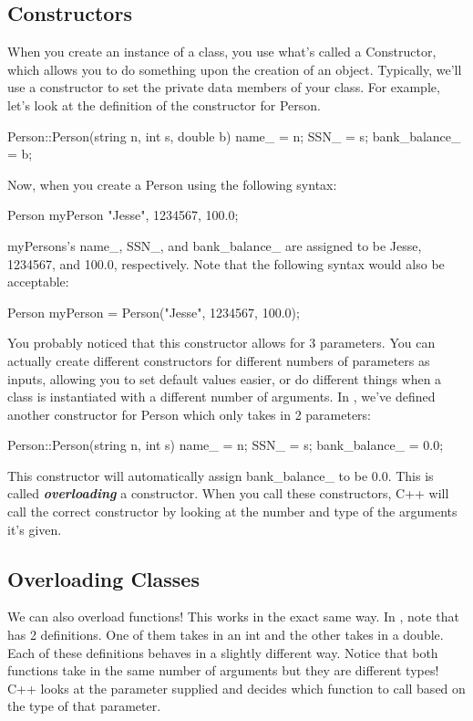 \documentclass{tufte-handout}
\begin{document}
\subsection{Constructors}
When you create an instance of a class, you use what's called a Constructor, which allows you to do something upon the creation of an object.
Typically, we'll use a constructor to set the private data members of your class.
For example, let's look at the definition of the constructor for Person.
\begin{Code}
Person::Person(string n, int s, double b) 
{
    name_ = n;
    SSN_ = s;
    bank_balance_ = b;
}
\end{Code}
Now, when you create a Person using the following syntax:
\begin{Code}
    Person myPerson {"Jesse", 1234567, 100.0};
\end{Code}

myPersons's name\_, SSN\_, and bank\_balance\_ are assigned to be Jesse, 1234567, and 100.0, respectively. 
Note that the following syntax would also be acceptable:
\begin{Code}
    Person myPerson = Person("Jesse", 1234567, 100.0);
\end{Code}

You probably noticed that this constructor allows for 3 parameters.
You can actually create different constructors for different numbers of parameters as inputs, allowing you to set default values easier, or do different things when a class is instantiated with a different number of arguments.
In , we've defined another constructor for Person which only takes in 2 parameters:
\begin{Code}
Person::Person(string n, int s) 
{
    name_ = n;
    SSN_ = s;
    bank_balance_ = 0.0;
}
\end{Code}
This constructor will automatically assign bank\_balance\_ to be 0.0.
This is called \textit{\textbf{overloading}} a constructor.
When you call these constructors, C++ will call the correct constructor by looking at the number and type of the arguments it's given.
\subsection{Overloading Classes}
We can also overload functions! This works in the exact same way.
In , note that  has 2 definitions. 
One of them takes in an int and the other takes in a double.
Each of these definitions behaves in a slightly different way.
Notice that both functions take in the same number of arguments but they are different types!
C++ looks at the parameter supplied and decides which function to call based on the type of that parameter.
\end{document}
